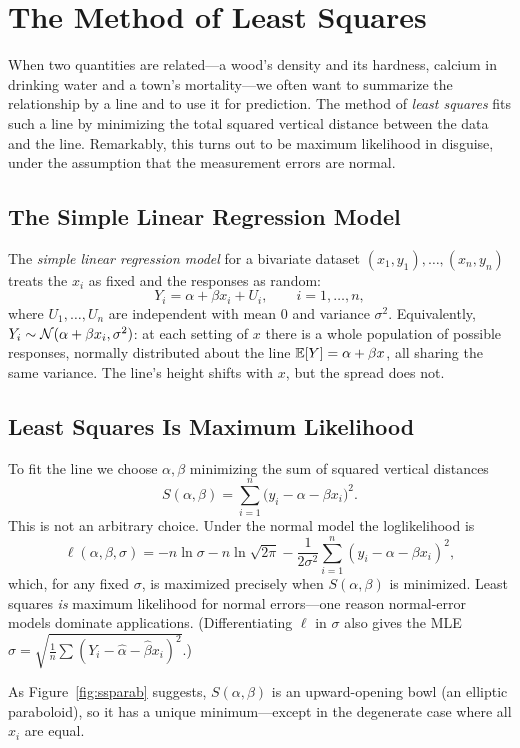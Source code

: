 \chapter{The Method of Least Squares}
\label{ch:leastsquares}

When two quantities are related—a wood's density and its hardness, calcium in
drinking water and a town's mortality—we often want to summarize the relationship
by a line and to use it for prediction. The method of \emph{least squares} fits
such a line by minimizing the total squared vertical distance between the data
and the line. Remarkably, this turns out to be maximum likelihood in disguise,
under the assumption that the measurement errors are normal.

\section{The Simple Linear Regression Model}

The \emph{simple linear regression model} for a bivariate dataset
$(x_1,y_1),\dots,(x_n,y_n)$ treats the $x_i$ as fixed and the responses as random:
\[
  Y_i=\alpha+\beta x_i+U_i,\qquad i=1,\dots,n,
\]
where $U_1,\dots,U_n$ are independent with mean $0$ and variance $\sigma^2$.
Equivalently, $Y_i\sim\mathcal{N}(\alpha+\beta x_i,\sigma^2)$: at each setting of $x$ there
is a whole population of possible responses, normally distributed about the line
$\mathbb{E}[Y]=\alpha+\beta x$, all sharing the same variance. The line's height shifts
with $x$, but the spread does not.

\section{Least Squares Is Maximum Likelihood}

To fit the line we choose $\alpha,\beta$ minimizing the sum of squared vertical
distances
\[
  S(\alpha,\beta)=\sum_{i=1}^n\bigl(y_i-\alpha-\beta x_i\bigr)^2.
\]
This is not an arbitrary choice. Under the normal model the loglikelihood is
\[
  \ell(\alpha,\beta,\sigma)=-n\ln\sigma-n\ln\sqrt{2\pi}-\frac{1}{2\sigma^2}\sum_{i=1}^n(y_i-\alpha-\beta x_i)^2,
\]
which, for any fixed $\sigma$, is maximized precisely when $S(\alpha,\beta)$ is
minimized. Least squares \emph{is} maximum likelihood for normal errors—one
reason normal-error models dominate applications. (Differentiating $\ell$ in
$\sigma$ also gives the MLE
$\hat\sigma=\sqrt{\tfrac1n\sum(Y_i-\hat\alpha-\hat\beta x_i)^2}$.)

As Figure~\ref{fig:ssparab} suggests, $S(\alpha,\beta)$ is an upward-opening
bowl (an elliptic paraboloid), so it has a unique minimum—except in the
degenerate case where all $x_i$ are equal.

